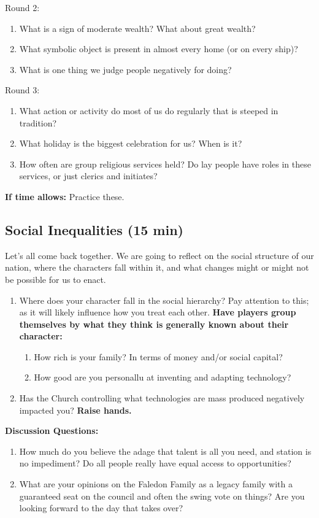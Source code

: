 \documentclass[green]{GL2020}
\begin{document}
Round 2:
\begin{enumerate}
	\item What is a sign of moderate wealth? What about great wealth?
	\item What symbolic object is present in almost every home (or on every ship)?
	\item What is one thing we judge people negatively for doing?
\end{enumerate}

Round 3:
\begin{enumerate}
	\item What action or activity do most of us do regularly that is steeped in tradition?
	\item What holiday is the biggest celebration for us? When is it?
	\item How often are group religious services held? Do lay people have roles in these services, or just clerics and initiates?
\end{enumerate}

\textbf{If time allows:} Practice these.

\subsection*{Social Inequalities (15 min)}
Let’s all come back together. We are going to reflect on the social structure of our nation, where the characters fall within it, and what changes might or might not be possible for us to enact.

\begin{enumerate}
	\item Where does your character fall in the social hierarchy? Pay attention to this; as it will likely influence how you treat each other. \textbf{Have players group themselves by what they think is generally known about their character:}
	\begin{enumerate}
		\item How rich is your family? In terms of money and/or social capital?
		\item How good are you personallu at inventing and adapting technology?
	\end{enumerate}
	\item Has the Church controlling what technologies are mass produced negatively impacted you? \textbf{Raise hands.} 
\end{enumerate}

\textbf{Discussion Questions:}
\begin{enumerate}
	\item How much do you believe the adage that talent is all you need, and station is no impediment? Do all people really have equal access to opportunities?
	\item What are your opinions on the Faledon Family as a legacy family with a guaranteed seat on the council and often the swing vote on things? Are you looking forward to the day that \cHeir{} takes over?
\end{enumerate}
\end{document}
